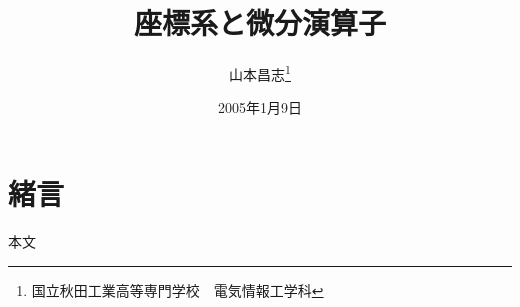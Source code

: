 \documentclass[10.5ptj, twocolumn, a4paper, uplatex, dvipdfmx]{jsarticle}
\title{座標系と微分演算子}
\author{山本昌志\thanks{国立秋田工業高等専門学校　電気情報工学科}}
\date{2005年1月9日}
\begin{document}
 
\maketitle
\section{緒言}
本文
\end{document}
